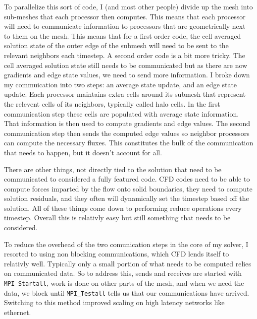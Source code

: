 \documentclass[12pt,parskip=full]{article}
\numberwithin{subsection}{section}
\begin{document}
		To parallelize this sort of code, I (and most other people) divide up the mesh into sub-meshes that each processor then computes.
		This means that each processor will need to communicate information to processors that are geometrically next to them on the 
		mesh. This means that for a first order code, the cell averaged solution state of the outer edge of the submesh will need to be
		sent to the relevant neighbors each timestep. A second order code is a bit more tricky. The cell averaged solution state still
		needs to be communicated but as there are now gradients and edge state values, we need to send more information. I broke down my
		commuication into two steps: an average state update, and an edge state update. Each processor maintains extra cells around its
		submesh that represent the relevent cells of its neighbors, typically called halo cells. In the first communication step these
		cells are populated with average state information. That information is then used to compute gradients and edge values. The
		second communication step then sends the computed edge values so neighbor processors can compute the necessary fluxes.
		This constitutes the bulk of the communication that needs to happen, but it doesn't account for all. 

		There are other things, not directly tied to the solution that need to be communicated to considered a fully featured code.
		CFD codes need to be able to compute forces imparted by the flow onto solid boundaries, they need to compute solution residuals,
		and they often will dynamically set the timestep based off the solution. All of these things come down to performing reduce
		operations every timestep. Overall this is relativly easy but still something that needs to be considered.

		To reduce the overhead of the two comunication steps in the core of my solver, I resorted to using non blocking communications,
		which CFD lends itself to relativly well. Typically only a small portion of what needs to be computed relies on communicated data.
		So to address this, sends and receives are started with \verb|MPI_Startall|, work is done on other parts of the mesh, and when we
		need the data, we block until \verb|MPI_Testall| tells us that our communications have arrived. Switching to this method improved scaling
		on high latency networks like ethernet.
\end{document}
